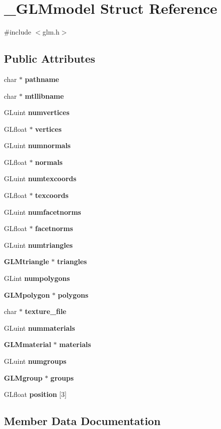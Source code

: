 \section{\-\_\-\-G\-L\-Mmodel Struct Reference}
\label{struct___g_l_mmodel}


{\ttfamily \#include $<$glm.\-h$>$}

\subsection*{Public Attributes}
\begin{DoxyCompactItemize}
\item 
char $\ast$ {\bf pathname}
\item 
char $\ast$ {\bf mtllibname}
\item 
G\-Luint {\bf numvertices}
\item 
G\-Lfloat $\ast$ {\bf vertices}
\item 
G\-Luint {\bf numnormals}
\item 
G\-Lfloat $\ast$ {\bf normals}
\item 
G\-Luint {\bf numtexcoords}
\item 
G\-Lfloat $\ast$ {\bf texcoords}
\item 
G\-Luint {\bf numfacetnorms}
\item 
G\-Lfloat $\ast$ {\bf facetnorms}
\item 
G\-Luint {\bf numtriangles}
\item 
{\bf G\-L\-Mtriangle} $\ast$ {\bf triangles}
\item 
G\-Lint {\bf numpolygons}
\item 
{\bf G\-L\-Mpolygon} $\ast$ {\bf polygons}
\item 
char $\ast$ {\bf texture\-\_\-file}
\item 
G\-Luint {\bf nummaterials}
\item 
{\bf G\-L\-Mmaterial} $\ast$ {\bf materials}
\item 
G\-Luint {\bf numgroups}
\item 
{\bf G\-L\-Mgroup} $\ast$ {\bf groups}
\item 
G\-Lfloat {\bf position} [3]
\end{DoxyCompactItemize}


\subsection{Member Data Documentation}
